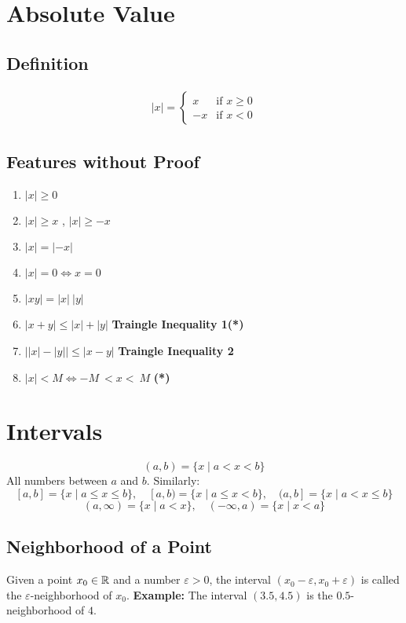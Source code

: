 \section{Absolute Value}
\subsection{Definition}
\begin{align*}
    |x| = \left\{
    \begin{array}{ll}
    x & \text{if } x \geq 0 \\
    -x & \text{if } x < 0
    \end{array}
    \right.
\end{align*}

\newpage
\subsection{Features without Proof}
\begin{enumerate}
    \item $|x|\geq 0$
    \item $|x| \geq x$ , $|x| \geq -x$
    \item $|x| = |-x|$
    \item $|x| = 0 \iff x = 0$
    \item $|xy| = |x|\:|y|$
    \item $|x+y|\leq |x|+|y|$ \textbf{Traingle Inequality 1(*)}
    \item $\Big| |x| - |y| \Big| \leq \Big| x - y \Big|$ \textbf{Traingle Inequality 2}
    \item \label{abs:open-abs}$|x| < M \iff -M\: <x<\: M$ \textbf{(*)}
\end{enumerate}

\section{Intervals}
\[
(a,b) = \{x \mid a < x < b\}
\]
All numbers between $a$ and $b$. Similarly:
\[
[a,b] = \{x \mid a \leq x \leq b\}, \quad [a,b) = \{x \mid a \leq x < b\}, \quad (a,b] = \{x \mid a < x \leq b\}
\]
\[
(a, \infty) = \{x \mid a < x\}, \quad (-\infty, a) = \{x \mid x < a\}
\]

\subsection{Neighborhood of a Point}
Given a point $x_0 \in \mathbb{R}$ and a number $\varepsilon > 0$, the interval $(x_0 - \varepsilon, x_0 + \varepsilon)$ is called the $\varepsilon$-neighborhood of $x_0$.  
\textbf{Example:}  
The interval $(3.5, 4.5)$ is the $0.5$-neighborhood of $4$.


